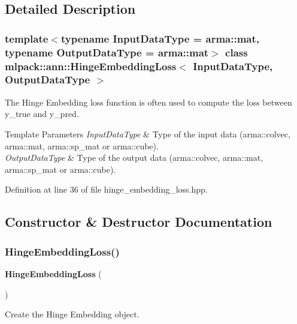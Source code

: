 \subsection{Detailed Description}
\subsubsection*{template$<$typename Input\+Data\+Type = arma\+::mat, typename Output\+Data\+Type = arma\+::mat$>$\newline
class mlpack\+::ann\+::\+Hinge\+Embedding\+Loss$<$ Input\+Data\+Type, Output\+Data\+Type $>$}

The Hinge Embedding loss function is often used to compute the loss between y\+\_\+true and y\+\_\+pred. 


\begin{DoxyTemplParams}{Template Parameters}
{\em Input\+Data\+Type} & Type of the input data (arma\+::colvec, arma\+::mat, arma\+::sp\+\_\+mat or arma\+::cube). \\
\hline
{\em Output\+Data\+Type} & Type of the output data (arma\+::colvec, arma\+::mat, arma\+::sp\+\_\+mat or arma\+::cube). \\
\hline
\end{DoxyTemplParams}


Definition at line 36 of file hinge\+\_\+embedding\+\_\+loss.\+hpp.



\subsection{Constructor \& Destructor Documentation}
\mbox{\label{classmlpack_1_1ann_1_1HingeEmbeddingLoss_a2289f44104560cff137f0ec305869d77}} 
\subsubsection{Hinge\+Embedding\+Loss()}
{\footnotesize\ttfamily \textbf{ Hinge\+Embedding\+Loss} (\begin{DoxyParamCaption}{ }\end{DoxyParamCaption})}



Create the Hinge Embedding object. 



